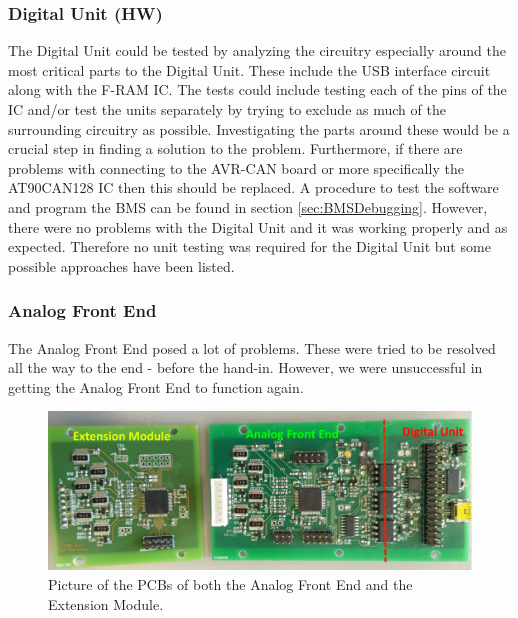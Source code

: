 \subsubsection{Digital Unit (HW)}
The Digital Unit could be tested by analyzing the circuitry especially around the most critical parts to the Digital Unit. These include the USB interface circuit along with the F-RAM IC. The tests could include testing each of the pins of the IC and/or test the units separately by trying to exclude as much of the surrounding circuitry as possible. Investigating the parts around these would be a crucial step in finding a solution to the problem. Furthermore, if there are problems with connecting to the AVR-CAN board or more specifically the AT90CAN128 IC then this should be replaced. A procedure to test the software and program the BMS can be found in section \vref{sec:BMSDebugging}. However, there were no problems with the Digital Unit and it was working properly and as expected. Therefore no unit testing was required for the Digital Unit but some possible approaches have been listed.

\subsubsection{Analog Front End}
The Analog Front End posed a lot of problems. These were tried to be resolved all the way to the end - before the hand-in. However, we were unsuccessful in getting the Analog Front End to function again.\\

\begin{figure}[H]
	\centering
	\includegraphics[width=1.0\linewidth]{Hardware/Pictures/BMSPCBS}
	\caption[Empty]{Picture of the PCBs of both the Analog Front End and the Extension Module.}
	\label{fig:BMSPCBS}
\end{figure}

